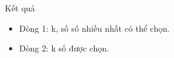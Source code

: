 Kết quả
\begin{itemize}
	\item     Dòng 1: k, số số nhiều nhất có thể chọn.   
	\item     Dòng 2: k số được chọn.   
\end{itemize}